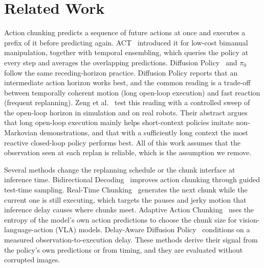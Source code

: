 \documentclass[11pt]{article}
\begin{document}
\section{Related Work}
\label{sec:related}

Action chunking predicts a sequence of future actions at once and executes a prefix of it before predicting again. ACT~\cite{zhao2023act} introduced it for low-cost bimanual manipulation, together with temporal ensembling, which queries the policy at every step and averages the overlapping predictions. Diffusion Policy~\cite{chi2023dp} and $\pi_0$~\cite{black2025pi0} follow the same receding-horizon practice. Diffusion Policy reports that an intermediate action horizon works best, and the common reading is a trade-off between temporally coherent motion (long open-loop execution) and fast reaction (frequent replanning). Zeng et al.~\cite{zeng2026openloop} test this reading with a controlled sweep of the open-loop horizon in simulation and on real robots. Their abstract argues that long open-loop execution mainly helps short-context policies imitate non-Markovian demonstrations, and that with a sufficiently long context the most reactive closed-loop policy performs best. All of this work assumes that the observation seen at each replan is reliable, which is the assumption we remove.

Several methods change the replanning schedule or the chunk interface at inference time. Bidirectional Decoding~\cite{liu2025bid} improves action chunking through guided test-time sampling. Real-Time Chunking~\cite{black2025rtc} generates the next chunk while the current one is still executing, which targets the pauses and jerky motion that inference delay causes where chunks meet. Adaptive Action Chunking~\cite{liang2026aac} uses the entropy of the model's own action predictions to choose the chunk size for vision-language-action (VLA) models. Delay-Aware Diffusion Policy~\cite{liao2025dap} conditions on a measured observation-to-execution delay. These methods derive their signal from the policy's own predictions or from timing, and they are evaluated without corrupted images.
\end{document}
